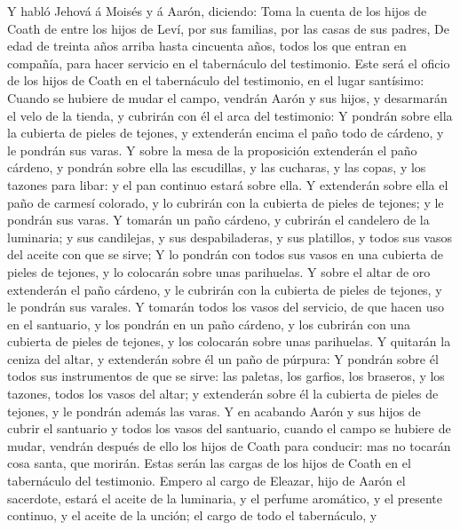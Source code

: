  Y habló Jehová á Moisés y á Aarón, diciendo:
 Toma la cuenta de los hijos de Coath de entre los hijos
de Leví, por sus familias, por las casas de sus padres, 
De edad de treinta años arriba hasta cincuenta años, todos los que
entran en compañía, para hacer servicio en el tabernáculo del
testimonio.  Este será el oficio de los hijos de Coath en
el tabernáculo del testimonio, en el lugar santísimo: 
Cuando se hubiere de mudar el campo, vendrán Aarón y sus hijos, y
desarmarán el velo de la tienda, y cubrirán con él el arca del
testimonio:  Y pondrán sobre ella la cubierta de pieles de
tejones, y extenderán encima el paño todo de cárdeno, y le pondrán sus
varas.  Y sobre la mesa de la proposición extenderán el
paño cárdeno, y pondrán sobre ella las escudillas, y las cucharas, y las
copas, y los tazones para libar: y el pan continuo estará sobre ella.
 Y extenderán sobre ella el paño de carmesí colorado, y lo
cubrirán con la cubierta de pieles de tejones; y le pondrán sus varas.
 Y tomarán un paño cárdeno, y cubrirán el candelero de la
luminaria; y sus candilejas, y sus despabiladeras, y sus platillos, y
todos sus vasos del aceite con que se sirve;  Y lo
pondrán con todos sus vasos en una cubierta de pieles de tejones, y lo
colocarán sobre unas parihuelas.  Y sobre el altar de oro
extenderán el paño cárdeno, y le cubrirán con la cubierta de pieles de
tejones, y le pondrán sus varales.  Y tomarán todos los
vasos del servicio, de que hacen uso en el santuario, y los pondrán en
un paño cárdeno, y los cubrirán con una cubierta de pieles de tejones, y
los colocarán sobre unas parihuelas.  Y quitarán la
ceniza del altar, y extenderán sobre él un paño de púrpura:
 Y pondrán sobre él todos sus instrumentos de que se
sirve: las paletas, los garfios, los braseros, y los tazones, todos los
vasos del altar; y extenderán sobre él la cubierta de pieles de tejones,
y le pondrán además las varas.  Y en acabando Aarón y sus
hijos de cubrir el santuario y todos los vasos del santuario, cuando el
campo se hubiere de mudar, vendrán después de ello los hijos de Coath
para conducir: mas no tocarán cosa santa, que morirán. Estas serán las
cargas de los hijos de Coath en el tabernáculo del testimonio.
 Empero al cargo de Eleazar, hijo de Aarón el sacerdote,
estará el aceite de la luminaria, y el perfume aromático, y el presente
continuo, y el aceite de la unción; el cargo de todo el tabernáculo, y
